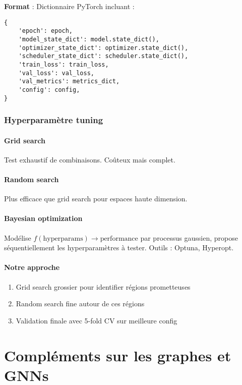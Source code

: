 \textbf{Format} : Dictionnaire PyTorch incluant :
\begin{verbatim}
{
    'epoch': epoch,
    'model_state_dict': model.state_dict(),
    'optimizer_state_dict': optimizer.state_dict(),
    'scheduler_state_dict': scheduler.state_dict(),
    'train_loss': train_loss,
    'val_loss': val_loss,
    'val_metrics': metrics_dict,
    'config': config,
}
\end{verbatim}

\subsection{Hyperparamètre tuning}

\subsubsection{Grid search}

Test exhaustif de combinaisons. Coûteux mais complet.

\subsubsection{Random search}

Plus efficace que grid search pour espaces haute dimension.

\subsubsection{Bayesian optimization}

Modélise $f(\text{hyperparams}) \rightarrow \text{performance}$ par processus gaussien, propose séquentiellement les hyperparamètres à tester. Outils : Optuna, Hyperopt.

\subsubsection{Notre approche}

\begin{enumerate}
    \item Grid search grossier pour identifier régions prometteuses
    \item Random search fine autour de ces régions
    \item Validation finale avec 5-fold CV sur meilleure config
\end{enumerate}

\chapter{Compléments sur les graphes et GNNs}


